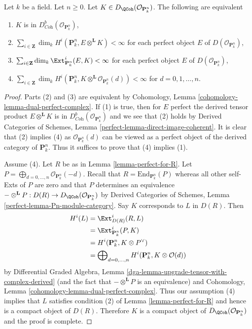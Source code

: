 \begin{lemma}
\label{lemma-coherent-on-projective-space}
Let $k$ be a field. Let $n \geq 0$. Let
$K \in D_\QCoh(\mathcal{O}_{\mathbf{P}^n_k})$.
The following are equivalent
\begin{enumerate}
\item $K$ is in $D^b_{\textit{Coh}}(\mathcal{O}_{\mathbf{P}^n_k})$,
\item $\sum_{i \in \mathbf{Z}}
\dim_k H^i(\mathbf{P}^n_k, E \otimes^\mathbf{L} K) < \infty$
for each perfect object $E$ of
$D(\mathcal{O}_{\mathbf{P}^n_k})$,
\item $\sum_{i \in \mathbf{Z}}
\dim_k \Ext^i_{\mathbf{P}^n_k}(E, K) < \infty$
for each perfect object $E$ of $D(\mathcal{O}_{\mathbf{P}^n_k})$,
\item $\sum_{i \in \mathbf{Z}} \dim_k H^i(\mathbf{P}^n_k,
K \otimes^\mathbf{L} \mathcal{O}_{\mathbf{P}^n_k}(d)) < \infty$
for $d = 0, 1, \ldots, n$.
\end{enumerate}
\end{lemma}

\begin{proof}
Parts (2) and (3) are equivalent by
Cohomology, Lemma \ref{cohomology-lemma-dual-perfect-complex}.
If (1) is true, then for $E$ perfect the derived tensor product
$E \otimes^\mathbf{L} K$ is in
$D^b_{\textit{Coh}}(\mathcal{O}_{\mathbf{P}^n_k})$
and we see that (2) holds by 
Derived Categories of Schemes, Lemma \ref{perfect-lemma-direct-image-coherent}.
It is clear that (2) implies (4) as $\mathcal{O}_{\mathbf{P}^n_k}(d)$
can be viewed
as a perfect object of the derived category of $\mathbf{P}^n_k$.
Thus it suffices to prove that (4) implies (1).

\medskip\noindent
Assume (4). Let $R$ be as in Lemma \ref{lemma-perfect-for-R}.
Let $P = \bigoplus_{d = 0, \ldots, n} \mathcal{O}_{\mathbf{P}^n_k}(-d)$.
Recall that $R = \text{End}_{\mathbf{P}^n_k}(P)$ whereas all other
self-Exts of $P$ are zero and that $P$ determines an equivalence
$- \otimes^\mathbf{L} P : D(R) \to D_\QCoh(\mathcal{O}_{\mathbf{P}^n_k})$
by Derived Categories of Schemes, Lemma \ref{perfect-lemma-Pn-module-category}.
Say $K$ corresponds to $L$ in $D(R)$. Then
\begin{align*}
H^i(L)
& =
\Ext^i_{D(R)}(R, L) \\
& =
\Ext^i_{\mathbf{P}^n_k}(P, K) \\
& =
H^i(\mathbf{P}^n_k, K \otimes P^\vee) \\
& =
\bigoplus\nolimits_{d = 0, \ldots, n}
H^i(\mathbf{P}^n_k, K \otimes \mathcal{O}(d))
\end{align*}
by Differential Graded Algebra, Lemma
\ref{dga-lemma-upgrade-tensor-with-complex-derived}
(and the fact that $- \otimes^\mathbf{L} P$ is an equivalence)
and Cohomology, Lemma \ref{cohomology-lemma-dual-perfect-complex}.
Thus our assumption (4) implies that $L$ satisfies condition (2) of
Lemma \ref{lemma-perfect-for-R} and hence is a compact object of $D(R)$.
Therefore $K$ is a compact object of
$D_\QCoh(\mathcal{O}_{\mathbf{P}^n_k})$
and the proof is complete.
\end{proof}

